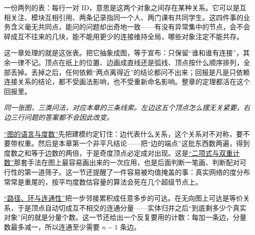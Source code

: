 一份两列的表：每行一对 ID，意思是这两个对象之间存在某种关系。它可以是互相关注、模块互相引用、两条记录指同一个人、两门课有共同学生。这四件事的业务含义毫无共同点，能问的问题却出奇地一致——有没有异常集中的节点，会不会碎成互不往来的几块，能不能用更少的连接维持全局，哪些对象注定不能共存。

这一章处理的就是这张表。把它抽象成图，等于宣布：只保留``谁和谁有连接''，其余一律不记。顶点在纸上的位置、边画成直线还是弧线、顶点按什么顺序排列，全部丢掉。丢掉之后，任何依赖``两点离得近''的结论都问不出来；回报是凡是只依赖连接关系的结论，都不受画法影响，也不受重新命名影响。整章的定理都活在这个回报里。

\begin{center}

\emph{同一张图，三类问法，对应本章的三条线索。左边这五个顶点怎么摆无关紧要，右边三行问题的答案都不会因此改变。}
\end{center}

\hyperref[sec:04-Discrete-Mathematics/03-Graph-Theory/01]{``图的语言与度数''}先把建模约定钉住：边代表什么关系，这个关系对不对称，要不要带权重。然后是本章第一个非平凡结论——把``边的端点''这批东西数两遍，得到度数之和等于边数的两倍，于是奇度顶点必定成对出现。这是\hyperref[sec:04-Discrete-Mathematics/01-Combinatorics/02]{``二项式与双重计数''}那套手法在图上最容易画出来的一次应用，也是后面判断一笔画、判断配对可行性的第一道筛子。这一节还提醒了一件容易被均值掩盖的事：真实网络的度分布常常是重尾的，按平均度数估容量的算法会死在几个超级节点上。

\hyperref[sec:04-Discrete-Mathematics/03-Graph-Theory/02]{``路径、环与连通性''}把一步邻接累积成任意多步的可达。在无向图上可达是等价关系，于是顶点自动切成互不相交的连通分量——实体归并之后``到底剩多少个真实对象''问的就是分量个数。这一节还给出一个反复要用的计数：每加一条边，分量数最多减一，所以连通至少需要 \(n-1\) 条边。

